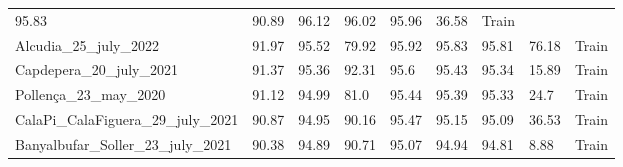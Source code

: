 \begin{table}[H]
{\begin{tabular}{lllllllll}
            95.83
                                                   & 90.89               &
            96.12
                                                   & 96.02               &
            95.96
                                                   & 36.58               &
            {\color[HTML]{66c2a5} Train}
            \\
            Alcudia\_25\_july\_2022                & 91.97               &
            95.52
                                                   & 79.92               &
            95.92
                                                   & 95.83               &
            95.81
                                                   & 76.18               &
            {\color[HTML]{66c2a5} Train}
            \\
            Capdepera\_20\_july\_2021              & 91.37               &
            95.36
                                                   & 92.31               & 95.6
                                                   & 95.43               &
            95.34
                                                   & 15.89               &
            {\color[HTML]{66c2a5} Train}
            \\
            Pollença\_23\_may\_2020                & 91.12               &
            94.99
                                                   & 81.0                &
            95.44
                                                   & 95.39               &
            95.33
                                                   & 24.7                &
            {\color[HTML]{66c2a5} Train}
            \\
            CalaPi\_CalaFiguera\_29\_july\_2021    & 90.87               &
            94.95
                                                   & 90.16               &
            95.47
                                                   & 95.15               &
            95.09
                                                   & 36.53               &
            {\color[HTML]{66c2a5} Train}
            \\
            Banyalbufar\_Soller\_23\_july\_2021    & 90.38               &
            94.89
                                                   & 90.71               &
            95.07
                                                   & 94.94               &
            94.81
                                                   & 8.88                &
            {\color[HTML]{66c2a5} Train}
            \\

\end{tabular}}
\end{table}
